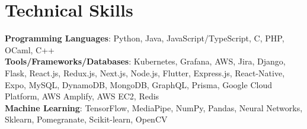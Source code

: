 \documentclass[letterpaper,10pt]{article}
\begin{document}
\section{Technical Skills}
\begin{itemize}[leftmargin=0.15in, label={}]
  \small{\item{
        \textbf{Programming Languages}{: Python, Java, JavaScript/TypeScript, C, PHP, OCaml, C++} \\
        \vspace{2pt}
        \textbf{Tools/Frameworks/Databases}{: Kubernetes, Grafana, AWS, Jira, Django, Flask, React.js, Redux.js, Next.js, Node.js, Flutter, Express.js, React-Native, Expo, MySQL, DynamoDB, MongoDB, GraphQL, Prisma, Google Cloud Platform, AWS Amplify, AWS
          EC2, Redis} \\
        \vspace{2pt}
        \textbf{Machine Learning}{: TensorFlow, MediaPipe, NumPy, Pandas, Neural Networks, Sklearn, Pomegranate, Scikit-learn, OpenCV} \\
        }}
\end{itemize}


\end{document}
